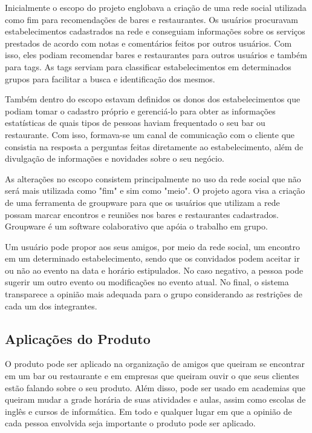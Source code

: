  Inicialmente o escopo do projeto englobava a criação de uma rede social utilizada como fim para recomendações de bares e restaurantes. Os usuários procuravam estabelecimentos cadastrados na rede e conseguiam informações sobre os serviços prestados de acordo com notas e comentários feitos por outros usuários. Com isso, eles podiam recomendar bares e restaurantes para outros usuários e também para tags. As tags serviam para classificar estabelecimentos em determinados grupos para facilitar a busca e identificação dos mesmos.

 Também dentro do escopo estavam definidos os donos dos estabelecimentos que podiam tomar o cadastro próprio e gerenciá-lo para obter as informações estatísticas de quais tipos de pessoas haviam frequentado o seu bar ou restaurante. Com isso, formava-se um canal de comunicação com o cliente que consistia na resposta a perguntas feitas diretamente ao estabelecimento, além de divulgação de informações e novidades sobre o seu negócio.

 As alterações no escopo consistem principalmente no uso da rede social que não será mais utilizada como "fim" e sim como "meio". O projeto agora visa a criação de uma ferramenta de groupware para que os usuários que utilizam a rede possam marcar encontros e reuniões nos bares e restaurantes cadastrados. Groupware é um software colaborativo que apóia o trabalho em grupo.

 Um usuário pode propor aos seus amigos, por meio da rede social, um encontro em um determinado estabelecimento, sendo que os convidados podem aceitar ir ou não ao evento na data e horário estipulados. No caso negativo, a pessoa pode sugerir um outro evento ou modificações no evento atual. No final, o sistema transparece a opinião mais adequada para o grupo considerando as restrições de cada um dos integrantes.

\subsection{Aplicações do Produto}

 O produto pode ser aplicado na organização de amigos que queiram se encontrar em um bar ou restaurante e em empresas que queiram ouvir o que seus clientes estão falando sobre o seu produto. Além disso, pode ser usado em academias que queiram mudar a grade horária de suas atividades e aulas, assim como escolas de inglês e cursos de informática. Em todo e qualquer lugar em que a opinião de cada pessoa envolvida seja importante o produto pode ser aplicado.

